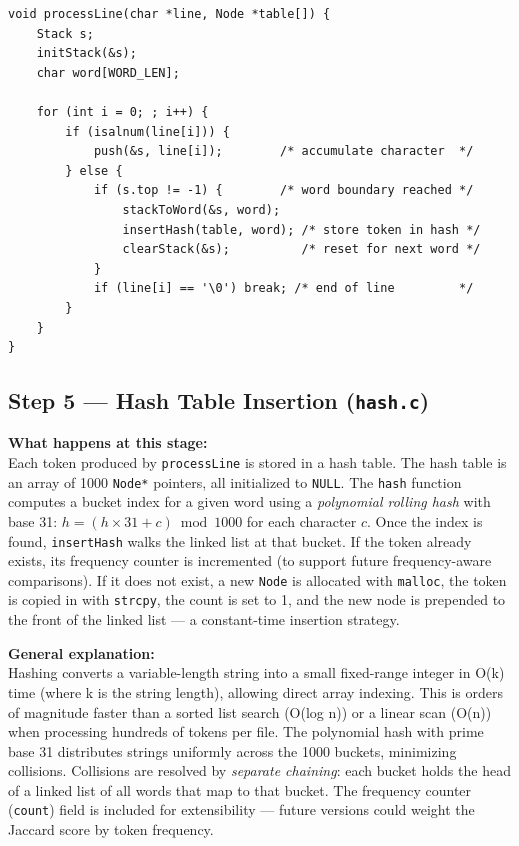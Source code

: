 \documentclass[12pt,a4paper]{article}
\begin{document}
\begin{lstlisting}[caption={\texttt{utils.c} -- \texttt{processLine}: tokenize a line using the Stack}]
void processLine(char *line, Node *table[]) {
    Stack s;
    initStack(&s);
    char word[WORD_LEN];

    for (int i = 0; ; i++) {
        if (isalnum(line[i])) {
            push(&s, line[i]);        /* accumulate character  */
        } else {
            if (s.top != -1) {        /* word boundary reached */
                stackToWord(&s, word);
                insertHash(table, word); /* store token in hash */
                clearStack(&s);          /* reset for next word */
            }
            if (line[i] == '\0') break; /* end of line         */
        }
    }
}
\end{lstlisting}

\newpage

\subsection{Step 5 — Hash Table Insertion (\texttt{hash.c})}

\textbf{What happens at this stage:}\\
Each token produced by \texttt{processLine} is stored in a hash table. The hash table is an array of 1000 \texttt{Node*} pointers, all initialized to \texttt{NULL}. The \texttt{hash} function computes a bucket index for a given word using a \textit{polynomial rolling hash} with base 31: $h = (h \times 31 + c) \bmod 1000$ for each character $c$. Once the index is found, \texttt{insertHash} walks the linked list at that bucket. If the token already exists, its frequency counter is incremented (to support future frequency-aware comparisons). If it does not exist, a new \texttt{Node} is allocated with \texttt{malloc}, the token is copied in with \texttt{strcpy}, the count is set to 1, and the new node is prepended to the front of the linked list — a constant-time insertion strategy.

\smallskip
\textbf{General explanation:}\\
Hashing converts a variable-length string into a small fixed-range integer in O(k) time (where k is the string length), allowing direct array indexing. This is orders of magnitude faster than a sorted list search (O(log n)) or a linear scan (O(n)) when processing hundreds of tokens per file. The polynomial hash with prime base 31 distributes strings uniformly across the 1000 buckets, minimizing collisions. Collisions are resolved by \textit{separate chaining}: each bucket holds the head of a linked list of all words that map to that bucket. The frequency counter (\texttt{count}) field is included for extensibility — future versions could weight the Jaccard score by token frequency.
\end{document}
